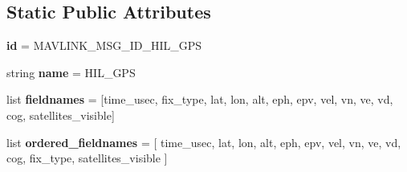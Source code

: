 \subsection*{Static Public Attributes}
\begin{DoxyCompactItemize}
\item 
\mbox{\label{classpymavlink_1_1dialects_1_1v10_1_1MAVLink__hil__gps__message_acc02ffeab3df0f7a6f3791afc32a271e}} 
{\bfseries id} = M\+A\+V\+L\+I\+N\+K\+\_\+\+M\+S\+G\+\_\+\+I\+D\+\_\+\+H\+I\+L\+\_\+\+G\+PS
\item 
\mbox{\label{classpymavlink_1_1dialects_1_1v10_1_1MAVLink__hil__gps__message_a3f6e7b6ea855f4082232a5473fc897fe}} 
string {\bfseries name} = \textquotesingle{}H\+I\+L\+\_\+\+G\+PS\textquotesingle{}
\item 
\mbox{\label{classpymavlink_1_1dialects_1_1v10_1_1MAVLink__hil__gps__message_a55b62fe462136ec05e9c699963dc9c1f}} 
list {\bfseries fieldnames} = \mbox{[}\textquotesingle{}time\+\_\+usec\textquotesingle{}, \textquotesingle{}fix\+\_\+type\textquotesingle{}, \textquotesingle{}lat\textquotesingle{}, \textquotesingle{}lon\textquotesingle{}, \textquotesingle{}alt\textquotesingle{}, \textquotesingle{}eph\textquotesingle{}, \textquotesingle{}epv\textquotesingle{}, \textquotesingle{}vel\textquotesingle{}, \textquotesingle{}vn\textquotesingle{}, \textquotesingle{}ve\textquotesingle{}, \textquotesingle{}vd\textquotesingle{}, \textquotesingle{}cog\textquotesingle{}, \textquotesingle{}satellites\+\_\+visible\textquotesingle{}\mbox{]}
\item 
\mbox{\label{classpymavlink_1_1dialects_1_1v10_1_1MAVLink__hil__gps__message_a3cc3767e3be9ccba34d2b95e69d1a4c8}} 
list {\bfseries ordered\+\_\+fieldnames} = \mbox{[} \textquotesingle{}time\+\_\+usec\textquotesingle{}, \textquotesingle{}lat\textquotesingle{}, \textquotesingle{}lon\textquotesingle{}, \textquotesingle{}alt\textquotesingle{}, \textquotesingle{}eph\textquotesingle{}, \textquotesingle{}epv\textquotesingle{}, \textquotesingle{}vel\textquotesingle{}, \textquotesingle{}vn\textquotesingle{}, \textquotesingle{}ve\textquotesingle{}, \textquotesingle{}vd\textquotesingle{}, \textquotesingle{}cog\textquotesingle{}, \textquotesingle{}fix\+\_\+type\textquotesingle{}, \textquotesingle{}satellites\+\_\+visible\textquotesingle{} \mbox{]}

\end{DoxyCompactItemize}
